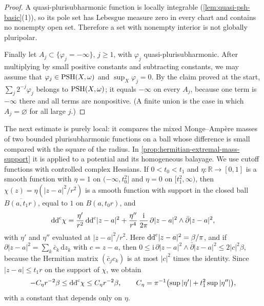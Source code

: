 \begin{proof}
A quasi-plurisubharmonic function is locally integrable (\cref{lem:quasi-psh-basic}(1)), so its pole set has Lebesgue measure zero in every chart and contains no nonempty open set. Therefore a set with nonempty interior is not globally pluripolar.

Finally let $A_j\subset\{\varphi_j=-\infty\}$, $j\geq1$, with $\varphi_j$ quasi-plurisubharmonic. After multiplying by small positive constants and subtracting constants, we may assume that $\varphi_j\in\mathrm{PSH}(X,\omega)$ and $\sup_X\varphi_j=0$. By the claim proved at the start, $\sum_j2^{-j}\varphi_j$ belongs to $\mathrm{PSH}(X,\omega)$; it equals $-\infty$ on every $A_j$, because one term is $-\infty$ there and all terms are nonpositive. (A finite union is the case in which $A_j=\varnothing$ for all large $j$.)
\end{proof}

The next estimate is purely local: it compares the mixed Monge--Amp\`ere masses of two bounded plurisubharmonic functions on a ball whose difference is small compared with the square of the radius. In \cref{prop:hermitian-extremal-mass-support} it is applied to a potential and its homogeneous balayage. We use cutoff functions with controlled complex Hessians. If $0<t_0<t_1$ and $\eta\colon\mathbb R\to[0,1]$ is a smooth function with $\eta=1$ on $(-\infty,t_0^2]$ and $\eta=0$ on $[t_1^2,\infty)$, then $\chi(z)=\eta(|z-a|^2/r^2)$ is a smooth function with support in the closed ball $\overline{B(a,t_1r)}$, equal to $1$ on $B(a,t_0r)$, and
\[
 \mathrm{dd}^{\mathrm{c}}\chi=\frac{\eta'}{r^2}\,\mathrm{dd}^{\mathrm{c}}|z-a|^2+\frac{\eta''}{r^4}\,\frac{\mathrm i}{2\pi}\,\partial|z-a|^2\wedge\bar\partial|z-a|^2,
\]
with $\eta'$ and $\eta''$ evaluated at $|z-a|^2/r^2$. Here $\mathrm{dd}^{\mathrm{c}}|z-a|^2=\beta/\pi$, and if $\partial|z-a|^2=\sum_k\bar c_k\,\mathrm dz_k$ with $c=z-a$, then $0\leq\mathrm i\,\partial|z-a|^2\wedge\bar\partial|z-a|^2\leq2|c|^2\beta$, because the Hermitian matrix $(\bar c_jc_k)$ is at most $|c|^2$ times the identity. Since $|z-a|\leq t_1r$ on the support of $\chi$, we obtain
\begin{equation}\label{eq:scaled-cutoff-hessian}
 -C_\eta r^{-2}\beta\leq\mathrm{dd}^{\mathrm{c}}\chi\leq C_\eta r^{-2}\beta,\qquad C_\eta=\pi^{-1}\bigl(\sup|\eta'|+t_1^2\sup|\eta''|\bigr),
\end{equation}
with a constant that depends only on $\eta$.

